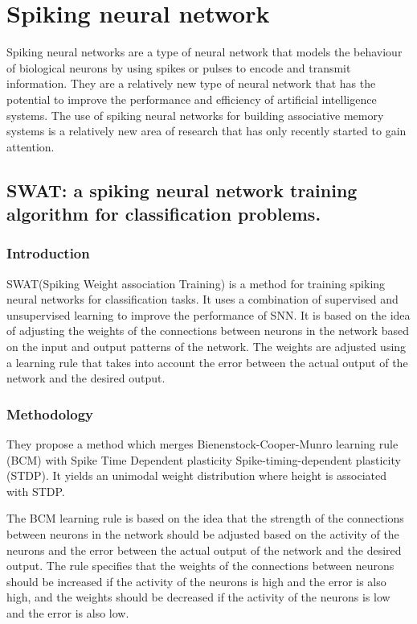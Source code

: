 \section{Spiking neural network}
Spiking neural networks are a type of neural network that models the behaviour
of biological neurons by using spikes or pulses to encode and transmit
information. They are a relatively new type of neural network that has the
potential to improve the performance and efficiency of artificial intelligence
systems. The use of spiking neural networks for building associative memory
systems is a relatively new area of research that has only recently started to
gain attention.

\subsection{SWAT: a spiking neural network training algorithm for classification problems.}
\subsubsection{Introduction}
SWAT\cite{swat}(Spiking Weight association Training) is a method for training
spiking neural networks for classification tasks. It uses a combination of
supervised and unsupervised learning to improve the performance of SNN. It is
based on the idea of adjusting the weights of the connections between neurons
in the network based on the input and output patterns of the network. The
weights are adjusted using a learning rule that takes into account the error
between the actual output of the network and the desired output.
\subsubsection{Methodology}
They propose a method which merges Bienenstock-Cooper-Munro learning rule
(BCM)\cite{bcm} with Spike Time Dependent plasticity Spike-timing-dependent
plasticity (STDP)\cite{stdp}. It yields an unimodal weight distribution where
height is associated with STDP.

The BCM learning rule is based on the idea that the strength of the connections
between neurons in the network should be adjusted based on the activity of the
neurons and the error between the actual output of the network and the desired
output. The rule specifies that the weights of the connections between neurons
should be increased if the activity of the neurons is high and the error is
also high, and the weights should be decreased if the activity of the neurons
is low and the error is also low.

